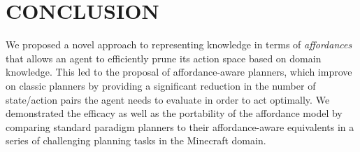 \documentclass[]{article}
\newcommand{\dnote}[1]{\textcolor{Orange}{\textbf{D: #1}}}
\begin{document}


\section{CONCLUSION}

We proposed a novel approach to representing knowledge in terms of
{\em affordances}~\citep{gibson77} that allows an agent to efficiently
prune its action space based on domain knowledge. This led to the 
proposal of affordance-aware planners, which improve on classic planners
by providing a significant reduction in the number of state/action pairs the
agent needs to evaluate in order to act optimally. We demonstrated the efficacy 
as well as the portability of the affordance model by comparing standard paradigm
planners to their affordance-aware equivalents in a series of challenging planning tasks in the Minecraft
domain.
\end{document}
